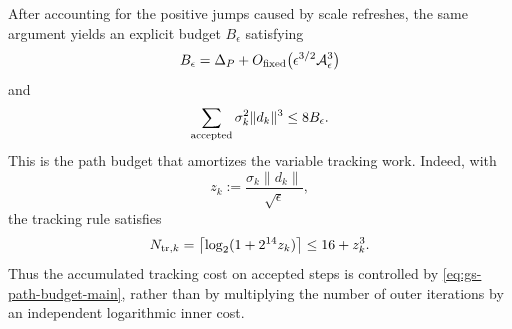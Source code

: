 After accounting for the positive jumps caused by scale refreshes,
the same argument yields an explicit budget $B_\epsilon$ satisfying
\begin{equation}
    B_\epsilon
    =
    \Delta_P
    +
    O_{\rm fixed}
    \bigl(
        \epsilon^{3/2}\mathcal A_\epsilon^3
    \bigr)
    \label{eq:gs-budget-asymptotic}
\end{equation}
and
\begin{equation}
    \sum_{\rm accepted}
    \sigma_k^2\|d_k\|^3
    \le
    8B_\epsilon.
    \label{eq:gs-path-budget-main}
\end{equation}
This is the path budget that amortizes the variable tracking work.
Indeed, with
\[
    z_k:=\frac{\sigma_k\|d_k\|}{\sqrt\epsilon},
\]
the tracking rule satisfies
\[
    N_{{\rm tr},k}
    =
    \left\lceil
        \log_2(1+2^{14}z_k)
    \right\rceil
    \le
    16+z_k^3.
\]
Thus the accumulated tracking cost on accepted steps is controlled by
\eqref{eq:gs-path-budget-main}, rather than by multiplying the number
of outer iterations by an independent logarithmic inner cost.


